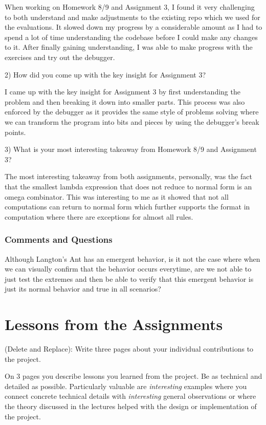 \documentclass{article}
\theoremstyle{theorem}
\theoremstyle{definition}
\theoremstyle{remark}
\begin{document}
When working on Homework 8/9 and Assignment 3, I found it very challenging to both understand and make adjustments to the existing repo which we used for the evaluations.
It slowed down my progress by a considerable amount as I had to spend a lot of time understanding the codebase before I could make any changes to it.
After finally gaining understanding, I was able to make progress with the exercises and try out the debugger.

2) How did you come up with the key insight for Assignment 3?

I came up with the key insight for Assignment 3 by first understanding the problem and then breaking it down into smaller parts. This process was also enforced by the debugger as it provides the same style of problems solving where we can transform the program into bits and pieces by using the debugger's break points.

3) What is your most interesting takeaway from Homework 8/9 and Assignment 3?

The most interesting takeaway from both assignments, personally, was the fact that the smallest lambda expression that does not reduce to normal form is an omega combinator. This was interesting to me as it showed that not all computations can return to normal form which further supports the format in computation where there are exceptions for almost all rules.

\subsubsection*{Comments and Questions}

Although Langton's Ant has an emergent behavior, is it not the case where when we can visually confirm that the behavior occurs everytime, are we not able to just test the extremes and then be able to verify that this emergent behavior is just its normal behavior and true in all scenarios?

\section{Lessons from the Assignments}

(Delete and Replace): Write three pages about your individual contributions to the project.

On 3 pages you describe lessons you learned from the project. Be as technical and detailed as possible. Particularly valuable are \emph{interesting} examples where you connect concrete technical details with \emph{interesting} general observations or where the theory discussed in the lectures helped with the design or implementation of the project.
\end{document}
